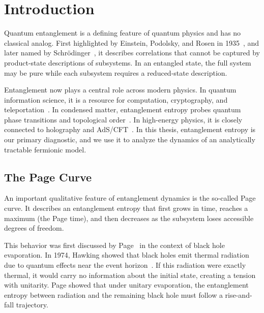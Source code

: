 \documentclass[12pt,oneside,openright]{report}
\theoremstyle{definition}
\theoremstyle{plain}
\theoremstyle{remark}
\begin{document}
\renewcommand{\contentsname}{Table of Contents}
\tableofcontents
{}
\cleardoublepage

\listoffigures
{}
\cleardoublepage


\cleardoublepage
\hypersetup{pageanchor=true}

\chapter{Introduction}
\label{ch:introduction}

Quantum entanglement is a defining feature of quantum physics and has no classical analog.
First highlighted by Einstein, Podolsky, and Rosen in 1935~\cite{EPR1935}, and later named by Schrödinger~\cite{Schrodinger1935}, it describes correlations that cannot be captured by product-state descriptions of subsystems.
In an entangled state, the full system may be pure while each subsystem requires a reduced-state description.

Entanglement now plays a central role across modern physics.
In quantum information science, it is a resource for computation, cryptography, and teleportation~\cite{NielsenChuang}.
In condensed matter, entanglement entropy probes quantum phase transitions and topological order~\cite{Amico2008,Eisert2010}.
In high-energy physics, it is closely connected to holography and AdS/CFT~\cite{Ryu2006,VanRaamsdonk2010}.
In this thesis, entanglement entropy is our primary diagnostic, and we use it to analyze the dynamics of an analytically tractable fermionic model.

\section{The Page Curve}

An important qualitative feature of entanglement dynamics is the so-called Page curve.
It describes an entanglement entropy that first grows in time, reaches a maximum (the Page time), and then decreases as the subsystem loses accessible degrees of freedom.

This behavior was first discussed by Page~\cite{Page1993} in the context of black hole evaporation.
In 1974, Hawking showed that black holes emit thermal radiation due to quantum effects near the event horizon~\cite{Hawking1975}.
If this radiation were exactly thermal, it would carry no information about the initial state, creating a tension with unitarity.
Page showed that under unitary evaporation, the entanglement entropy between radiation and the remaining black hole must follow a rise-and-fall trajectory.
\end{document}

